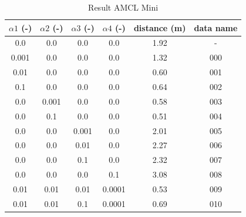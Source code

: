\begin{table}[H]
	\centering
	\begin{tabular}{|c|c|c|c|c|c|}
		\hline
		$\alpha 1$ (-) & $\alpha 2$ (-) & $\alpha 3$ (-) & $\alpha 4$ (-) & distance (m) & data name\\
		\hline		
		0.0 & 0.0 & 0.0 & 0.0 & 1.92 &  - \\
		\hline
		0.001 & 0.0 & 0.0 & 0.0 & 1.32 & 000 \\
		\hline
		0.01 & 0.0 & 0.0 & 0.0 & 0.60 & 001 \\
		\hline
		0.1 & 0.0 & 0.0 & 0.0 & 0.64 & 002 \\
		\hline
		0.0 & 0.001 & 0.0 & 0.0 & 0.58 & 003 \\
		\hline
		0.0 & 0.1 & 0.0 & 0.0 & 0.51 & 004 \\
		\hline
		0.0 & 0.0 & 0.001 & 0.0 & 2.01 & 005 \\
		\hline
		0.0 & 0.0 & 0.01 & 0.0 & 2.27 & 006 \\
		\hline
		0.0 & 0.0 & 0.1 & 0.0 & 2.32 & 007 \\
		\hline
		0.0 & 0.0 & 0.0 & 0.1 & 3.08  & 008 \\
		\hline
		0.01 & 0.01 & 0.01 & 0.0001 & 0.53 & 009 \\
		\hline
		0.01 & 0.01 & 0.1 & 0.0001 & 0.69 & 010 \\
		\hline
	\end{tabular}
	\caption{Result AMCL Mini}
\end{table}

